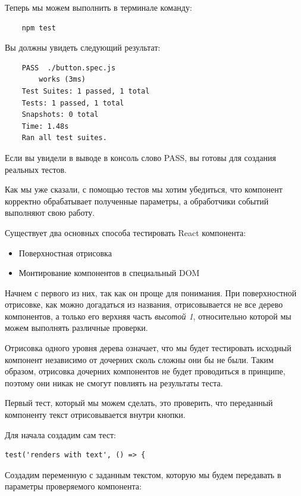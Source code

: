 Теперь мы можем выполнить в терминале команду:

\begin{lstlisting}
	npm test
\end{lstlisting}

Вы должны увидеть следующий результат:

\begin{lstlisting}
    PASS  ./button.spec.js
        works (3ms)
    Test Suites: 1 passed, 1 total
    Tests: 1 passed, 1 total
    Snapshots: 0 total
    Time: 1.48s
    Ran all test suites.
\end{lstlisting}

Если вы увидели в выводе в консоль слово PASS, вы готовы для создания реальных тестов.

Как мы уже сказали, с помощью тестов мы хотим убедиться, что компонент корректно обрабатывает полученные параметры, а обработчики событий выполняют свою работу.

Существует два основных способа тестировать React компонента:

\begin{itemize}
  \item Поверхностная отрисовка
  \item Монтирование компонентов в специальный DOM
\end{itemize}

Начнем с первого из них, так как он проще для понимания. При поверхностной отрисовке, как можно догадаться из названия, отрисовывается не все дерево компонентов, а только его верхняя часть \textit{высотой 1}, относительно которой мы можем выполнять различные проверки.

Отрисовка одного уровня дерева означает, что мы будет тестировать исходный компонент независимо от дочерних сколь сложны они бы не были. Таким образом, отрисовка дочерних компонентов не будет проводиться в принципе, поэтому они никак не смогут повлиять на результаты теста.

Первый тест, который мы можем сделать, это проверить, что переданный компоненту текст отрисовывается внутри кнопки.

Для начала создадим сам тест:

\begin{lstlisting}
test('renders with text', () => {
\end{lstlisting}

Создадим переменную с заданным текстом, которую мы будем передавать в параметры проверяемого компонента:

